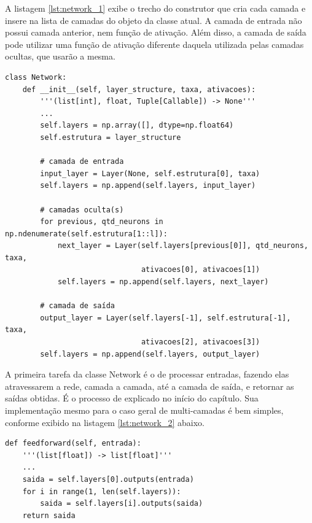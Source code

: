 A listagem \ref{lst:network_1} exibe o trecho do construtor que cria cada camada e insere na lista de camadas do objeto da classe atual. A camada de entrada não possui camada anterior, nem função de ativação. Além disso, a camada de saída pode utilizar uma função de ativação diferente daquela utilizada pelas camadas ocultas, que usarão a mesma.
\newline
\estiloR
\begin{lstlisting}[caption={Trecho da classe \eng{Network}}, label={lst:network_1}, escapeinside={\%}]
class Network:
    def __init__(self, layer_structure, taxa, ativacoes):
        '''(list[int], float, Tuple[Callable]) -> None'''
        ...
        self.layers = np.array([], dtype=np.float64)
        self.estrutura = layer_structure

        # camada de entrada
        input_layer = Layer(None, self.estrutura[0], taxa)
        self.layers = np.append(self.layers, input_layer)

        # camadas oculta(s)
        for previous, qtd_neurons in np.ndenumerate(self.estrutura[1::l]):
            next_layer = Layer(self.layers[previous[0]], qtd_neurons, taxa,
                               ativacoes[0], ativacoes[1])
            self.layers = np.append(self.layers, next_layer)

        # camada de saída
        output_layer = Layer(self.layers[-1], self.estrutura[-1], taxa,
                               ativacoes[2], ativacoes[3])
        self.layers = np.append(self.layers, output_layer)
\end{lstlisting}


A primeira tarefa da classe Network é o de processar entradas, fazendo elas atravessarem a rede, camada a camada, até a camada de saída, e retornar as saídas obtidas. É o processo de  explicado no início do capítulo. Sua implementação mesmo para o caso geral de multi-camadas é bem simples, conforme exibido na listagem \ref{lst:network_2} abaixo.
\newpage
\estiloR
\begin{lstlisting}[caption={Trecho da classe \eng{Network}}, label={lst:network_2}, escapeinside={\%}]
def feedforward(self, entrada):
    '''(list[float]) -> list[float]'''
    ...
    saida = self.layers[0].outputs(entrada)
    for i in range(1, len(self.layers)):
        saida = self.layers[i].outputs(saida)
    return saida
\end{lstlisting}


